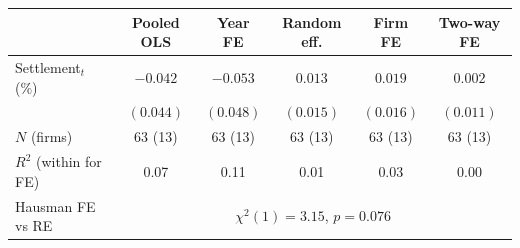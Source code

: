 \begin{tabular}{lccccc}
\toprule
 & Pooled OLS & Year FE & Random eff. & Firm FE & Two-way FE \\
\midrule
Settlement$_t$ (\%) & $-0.042$ & $-0.053$ & $0.013$ & $0.019$ & $0.002$ \\
 & $(0.044)$ & $(0.048)$ & $(0.015)$ & $(0.016)$ & $(0.011)$ \\
\midrule
$N$ (firms) & 63 (13) & 63 (13) & 63 (13) & 63 (13) & 63 (13) \\
$R^2$ (within for FE) & 0.07 & 0.11 & 0.01 & 0.03 & 0.00 \\
Hausman FE vs RE & \multicolumn{5}{c}{$\chi^2(1)=3.15$, $p=0.076$} \\
\bottomrule
\end{tabular}